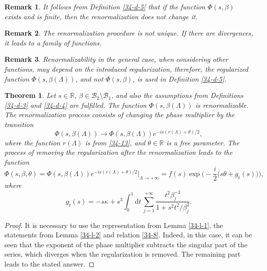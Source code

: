 \documentclass[a4paper]{article}
\newtheorem{theorem}{Theorem}
\newtheorem{remark}{Remark}
\begin{document}
\begin{remark}\label{34-r-12}
It follows from Definition \ref{34-d-5} that if the function $\Phi(s,\beta)$ exists and is finite, then the renormalization does not change it.
\end{remark}
\begin{remark}\label{34-r-13}
The renormalization procedure is not unique. If there are divergences, it leads to a family of functions.
\end{remark}
\begin{remark}\label{34-r-5}
Renormalizability in the general case, when considering other functions, may depend on the introduced regularization, therefore, the regularized function $\Phi(s,\beta(\Lambda))$, and not $\Phi(s,\beta)$, is used in Definition \ref{34-d-5}.
\end{remark}
\begin{theorem}\label{34-t-1}
Let $s\in\mathbb{R}$, $\beta\in\mathcal{B}_2\setminus\mathcal{B}_1$, and also the assumptions from Definitions \ref{34-d-3} and \ref{34-d-4} are fulfilled. The function $\Phi(s,\beta(\Lambda))$ is renormalizable. The renormalization process consists of changing the phase multiplier by the transition
\begin{equation}\label{34-14}
\Phi(s,\beta(\Lambda))\to \Phi(s,\beta(\Lambda))e^{-is(r(\Lambda)+\theta)/2},
\end{equation}
where the function $r(\Lambda)$ is from \eqref{34-13}, and $\theta\in\mathbb{R}$ is a free parameter. The process of removing the regularization after the renormalization leads to the function
\begin{equation}\label{34-16}
	\Phi(s,\beta,\theta)=\Phi(s,\beta(\Lambda))e^{-is(r(\Lambda)+\theta)/2}\bigg|_{\Lambda\to+\infty}=
	f(s)\exp\bigg(-\frac{i}{2}\big(s\theta+g_{\mathrm{r}}(s)\big)\bigg),
\end{equation}
where
\begin{equation}\label{34-19}
g_{\mathrm{r}}(s)=-s\kappa+
s^3\int_0^1\mathrm{d}t\,
\sum_{j=1}^{+\infty}\frac{t^2\beta_j^{-3}}{1+s^2t^2/\beta_j^2}.
\end{equation}
\end{theorem}
\begin{proof} It is necessary to use the representation from Lemma \ref{34-l-1}, the statements from Lemma \ref{34-l-2} and relation \eqref{34-8}. Indeed, in this case, it can be seen that the exponent of the phase multiplier subtracts the singular part of the series, which diverges when the regularization is removed. The remaining part leads to the stated answer.
\end{proof}
\end{document}
